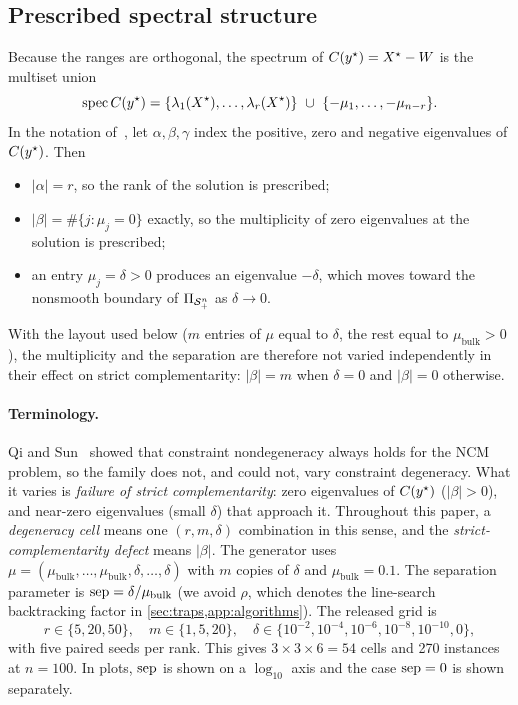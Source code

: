 \subsection{Prescribed spectral structure}\label{sec:spectrum}
Because the ranges are orthogonal, the spectrum of $C(y^\star)=X^\star-W$ is the
multiset union
\begin{equation}
  \operatorname{spec}C(\ys) = \{\lambda_1(\Xs),\dots,\lambda_r(\Xs)\}\ \cup\ \{-\mu_1,\dots,-\mu_{n-r}\}.
\end{equation}
In the notation of~\cite{qisun2006quadratically}, let $\alpha,\beta,\gamma$ index the
positive, zero and negative eigenvalues of $C(y^\star)$. Then
\begin{itemize}
  \item $|\alpha|=r$, so the rank of the solution is prescribed;
  \item $|\beta|=\#\{j:\mu_j=0\}$ exactly, so the multiplicity of zero
    eigenvalues at the solution is prescribed;
  \item an entry $\mu_j=\delta>0$ produces an eigenvalue $-\delta$, which moves
    toward the nonsmooth boundary of $\Pi_{\mathcal{S}_+^n}$ as $\delta\to0$.
\end{itemize}
With the layout used below ($m$ entries of $\mu$ equal to $\delta$, the rest
equal to $\mu_{\mathrm{bulk}}>0$), the multiplicity and the separation are
therefore not varied independently in their effect on strict
complementarity: $|\beta|=m$ when $\delta=0$ and $|\beta|=0$ otherwise.

\paragraph{Terminology.}
Qi and Sun~\cite{qisun2006quadratically} showed that constraint
nondegeneracy always holds for the NCM problem, so the family does not, and
could not, vary constraint degeneracy. What it varies is \emph{failure of
strict complementarity}: zero eigenvalues of $C(y^\star)$ ($|\beta|>0$), and
near-zero eigenvalues (small $\delta$) that approach it. Throughout this
paper, a \emph{degeneracy cell} means one $(r,m,\delta)$ combination in this
sense, and the \emph{strict-complementarity defect} means $|\beta|$.
The generator uses
$\mu=(\mu_{\mathrm{bulk}},\dots,\mu_{\mathrm{bulk}},\delta,\dots,\delta)$ with
$m$ copies of $\delta$ and $\mu_{\mathrm{bulk}}=0.1$. The separation parameter
is $\mathrm{sep}=\delta/\mu_{\mathrm{bulk}}$ (we avoid $\rho$, which denotes the
line-search backtracking factor in \cref{sec:traps,app:algorithms}). The released grid is
\[
  r\in\{5,20,50\},\quad m\in\{1,5,20\},\quad
  \delta\in\{10^{-2},10^{-4},10^{-6},10^{-8},10^{-10},0\},
\]
with five paired seeds per rank. This gives $3\times3\times6=54$ cells and
270 instances at $n=100$. In plots, $\mathrm{sep}$ is shown on a $\log_{10}$ axis and
the case $\mathrm{sep}=0$ is shown separately.

